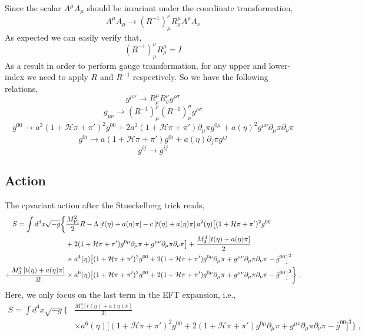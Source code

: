 \documentclass[a4paper,11pt]{article}
\def\be{\begin{equation}}
\def\ee{\end{equation}}
\newcommand{\HH}{\mathcal H}
\newcommand{\MP}{M_{\rm Pl}}
\begin{document}
Since the scalar $A^{\mu} A_{\mu}$ should be invariant under the coordinate transformation,
\be
A^{\mu} A_{\mu} \rightarrow  (R^{-1})_{\mu}^{\nu} R_{\rho}^{\mu} A^{\rho} A_{\nu}
\ee
As expected we can easily verify that,
\be
(R^{-1})_{\mu}^{\nu} R_{\rho}^{\mu} = I
\ee
As a result in order to perform gauge transformation, for any upper and lower-index we need to apply $R$  and $R^{-1}$ respectively. So we have the following relations,
\begin{equation}
g^{\mu \nu} \rightarrow R_{\rho}^{\mu} R_{\sigma}^{\nu} g^{\rho \sigma}
\end{equation}
\begin{equation}
g_{\mu \nu} \rightarrow (R^{-1})^{\rho}_{\mu}(R^{-1})^{\sigma}_{\nu} g^{\rho \sigma}
\end{equation}
\begin{equation}
g^{00} \rightarrow a^2 (1+ \HH \pi +  \pi')^2 g^{00}+2 a^2 (1+  \HH \pi +  \pi')  \partial_{\mu} \pi  g^{0 \mu}+ a(\eta)^2 g^{\mu \nu} \partial_{\mu} \pi \partial_{\nu} \pi
\end{equation}
\begin{equation}
g^{0i} \rightarrow a(1+\HH \pi + \pi') g^{0i}+a(\eta) \partial_{j} \pi  g^{i j}
\end{equation}
\begin{equation}
g^{ij} \rightarrow g^{ij}
\end{equation}
\subsection{Action}
The cpvariant action after the Stueckelberg trick reads,
\be
\label{EFTaction_cov}
\begin{split}
S=\int d^4 x \sqrt{-g} \bigg\{ & \frac{\MP^2}{2} R -  \Lambda \left[ t(\eta)+ a(\eta) \pi \right] - c \left[ t(\eta)+ a(\eta) \pi \right]  a^2(\eta)  \big[ (1+ \HH \pi + \pi')^2 g^{00} \\
&+ 2 (1+\HH \pi + \pi') g^{0 \mu} \partial_\mu \pi + g^{\mu \nu} \partial_\mu \pi \partial_\nu \pi  \big]  +\frac{M_2^4 \left[ t(\eta)+ a(\eta) \pi \right]}{2}  \\
& \times a^4 (\eta)  \big[ (1+ \HH \pi + \pi')^2 g^{00} + 2 (1+\HH \pi + \pi') g^{0 \mu} \partial_\mu \pi + g^{\mu \nu} \partial_\mu \pi \partial_\nu \pi  - \bar g^{00}\big]^2 
\\ +\frac{M_3^4 \left[ t(\eta)+ a(\eta) \pi \right]}{3!}  
& \times a^6 (\eta)  \big[ (1+ \HH \pi + \pi')^2 g^{00} + 2 (1+\HH \pi + \pi') g^{0 \mu} \partial_\mu \pi + g^{\mu \nu} \partial_\mu \pi \partial_\nu \pi  - \bar g^{00}\big]^3      \bigg\} \;,
\end{split}
\ee
Here, we only focus on the last term in the EFT expansion, i.e.,
\be
\begin{split}
S=\int d^4 x \sqrt{-g} \bigg\{ & \frac{M_3^4 \left[ t(\eta)+ a(\eta) \pi \right]}{3!}  \\ & \times a^6 (\eta)  \big[ (1+ \HH \pi + \pi')^2 g^{00} + 2 (1+\HH \pi + \pi') g^{0 \mu} \partial_\mu \pi + g^{\mu \nu} \partial_\mu \pi \partial_\nu \pi  - \bar g^{00}\big]^3      \bigg\} \;,
\end{split}
\ee
\end{document}
